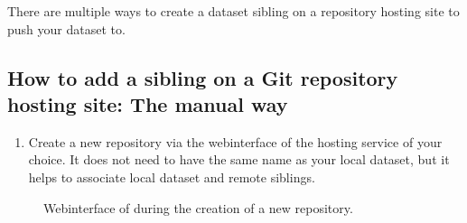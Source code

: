 \sphinxAtStartPar
There are multiple ways to create a dataset sibling on a repository hosting site to push your dataset to.


\subsection{How to add a sibling on a Git repository hosting site: The manual way}
\label{\detokenize{basics/101-139-hostingservices:how-to-add-a-sibling-on-a-git-repository-hosting-site-the-manual-way}}\begin{enumerate}
%
\item {} 
\sphinxAtStartPar
Create a new repository via the webinterface of the hosting service of your choice.
It does not need to have the same name as your local dataset, but it helps to associate local dataset and remote siblings.

\end{enumerate}

\begin{figure}[tbp]
\centering
\capstart

\noindent{}
\caption{Webinterface of {\hyperref[\detokenize{glossary:term-GIN}]{}} during the creation of a new repository.}\label{\detokenize{basics/101-139-hostingservices:id6}}\end{figure}


